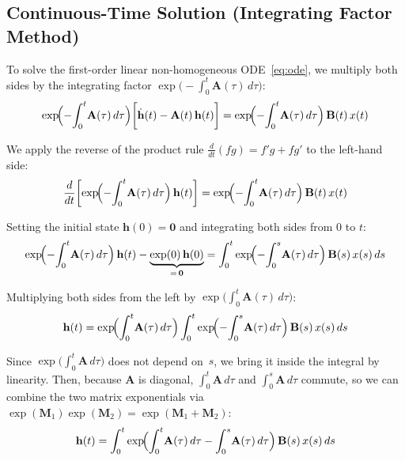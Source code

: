 \documentclass[11pt,a4paper]{article}
\begin{document}
\subsection{Continuous-Time Solution (Integrating Factor Method)}

To solve the first-order linear non-homogeneous ODE~\eqref{eq:ode}, we multiply both sides by the integrating factor $\exp\!\bigl(-\int_{0}^{t} \mathbf{A}(\tau)\,d\tau\bigr)$:
\begin{equation}
  \exp\!\Bigl(-\!\int_{0}^{t}\!\mathbf{A}(\tau)\,d\tau\Bigr)
  \biggl[\dot{\mathbf{h}}(t) - \mathbf{A}(t)\,\mathbf{h}(t)\biggr]
  = \exp\!\Bigl(-\!\int_{0}^{t}\!\mathbf{A}(\tau)\,d\tau\Bigr)\,\mathbf{B}(t)\,x(t)
\end{equation}

We apply the reverse of the product rule $\frac{d}{dt}(fg) = f'g + fg'$ to the left-hand side:
\begin{equation}
  \frac{d}{dt}\biggl[\exp\!\Bigl(-\!\int_{0}^{t}\!\mathbf{A}(\tau)\,d\tau\Bigr)\,\mathbf{h}(t)\biggr]
  = \exp\!\Bigl(-\!\int_{0}^{t}\!\mathbf{A}(\tau)\,d\tau\Bigr)\,\mathbf{B}(t)\,x(t)
\end{equation}

Setting the initial state $\mathbf{h}(0)=\mathbf{0}$ and integrating both sides from $0$ to $t$:
\begin{equation}
  \exp\!\Bigl(-\!\int_{0}^{t}\!\mathbf{A}(\tau)\,d\tau\Bigr)\,\mathbf{h}(t)
  - \underbrace{\exp(0)\,\mathbf{h}(0)}_{=\,\mathbf{0}}
  = \int_{0}^{t}\exp\!\Bigl(-\!\int_{0}^{s}\!\mathbf{A}(\tau)\,d\tau\Bigr)\,\mathbf{B}(s)\,x(s)\,ds
\end{equation}

Multiplying both sides from the left by $\exp\!\bigl(\int_{0}^{t}\mathbf{A}(\tau)\,d\tau\bigr)$:
\begin{equation}
  \mathbf{h}(t) = \exp\!\Bigl(\int_{0}^{t}\!\mathbf{A}(\tau)\,d\tau\Bigr)
  \int_{0}^{t}\exp\!\Bigl(-\!\int_{0}^{s}\!\mathbf{A}(\tau)\,d\tau\Bigr)\,\mathbf{B}(s)\,x(s)\,ds
\end{equation}

Since $\exp\!\bigl(\int_{0}^{t}\mathbf{A}\,d\tau\bigr)$ does not depend on~$s$, we bring it inside the integral by linearity.
Then, because $\mathbf{A}$ is diagonal, $\int_{0}^{t}\mathbf{A}\,d\tau$ and $\int_{0}^{s}\mathbf{A}\,d\tau$ commute, so we can combine the two matrix exponentials via $\exp(\mathbf{M}_1)\exp(\mathbf{M}_2) = \exp(\mathbf{M}_1 + \mathbf{M}_2)$:
\begin{equation}
  \mathbf{h}(t) = \int_{0}^{t}\exp\!\Bigl(\int_{0}^{t}\!\mathbf{A}(\tau)\,d\tau - \int_{0}^{s}\!\mathbf{A}(\tau)\,d\tau\Bigr)\,\mathbf{B}(s)\,x(s)\,ds
\end{equation}
\end{document}
